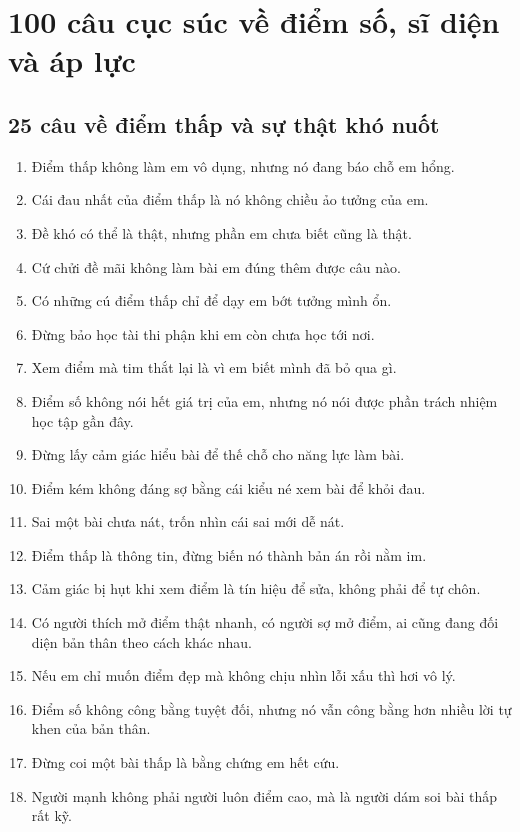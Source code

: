 \chapter{100 câu cục súc về điểm số, sĩ diện và áp lực}

\section{25 câu về điểm thấp và sự thật khó nuốt}
\begin{enumerate}[leftmargin=*]
\item Điểm thấp không làm em vô dụng, nhưng nó đang báo chỗ em hổng.
\item Cái đau nhất của điểm thấp là nó không chiều ảo tưởng của em.
\item Đề khó có thể là thật, nhưng phần em chưa biết cũng là thật.
\item Cứ chửi đề mãi không làm bài em đúng thêm được câu nào.
\item Có những cú điểm thấp chỉ để dạy em bớt tưởng mình ổn.
\item Đừng bảo học tài thi phận khi em còn chưa học tới nơi.
\item Xem điểm mà tim thắt lại là vì em biết mình đã bỏ qua gì.
\item Điểm số không nói hết giá trị của em, nhưng nó nói được phần trách nhiệm học tập gần đây.
\item Đừng lấy cảm giác hiểu bài để thế chỗ cho năng lực làm bài.
\item Điểm kém không đáng sợ bằng cái kiểu né xem bài để khỏi đau.
\item Sai một bài chưa nát, trốn nhìn cái sai mới dễ nát.
\item Điểm thấp là thông tin, đừng biến nó thành bản án rồi nằm im.
\item Cảm giác bị hụt khi xem điểm là tín hiệu để sửa, không phải để tự chôn.
\item Có người thích mở điểm thật nhanh, có người sợ mở điểm, ai cũng đang đối diện bản thân theo cách khác nhau.
\item Nếu em chỉ muốn điểm đẹp mà không chịu nhìn lỗi xấu thì hơi vô lý.
\item Điểm số không công bằng tuyệt đối, nhưng nó vẫn công bằng hơn nhiều lời tự khen của bản thân.
\item Đừng coi một bài thấp là bằng chứng em hết cứu.
\item Người mạnh không phải người luôn điểm cao, mà là người dám soi bài thấp rất kỹ.

\end{enumerate}
